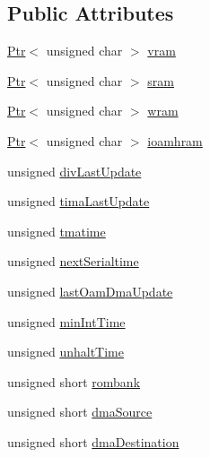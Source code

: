 \subsection*{Public Attributes}
\begin{DoxyCompactItemize}
\item 
\hyperlink{classgambatte_1_1SaveState_1_1Ptr}{Ptr}$<$ unsigned char $>$ \hyperlink{structgambatte_1_1SaveState_1_1Mem_a17be66d9d55708247cb6ea661163d433}{vram}
\item 
\hyperlink{classgambatte_1_1SaveState_1_1Ptr}{Ptr}$<$ unsigned char $>$ \hyperlink{structgambatte_1_1SaveState_1_1Mem_aa0d8ef750665ad81ec84ba8335af5800}{sram}
\item 
\hyperlink{classgambatte_1_1SaveState_1_1Ptr}{Ptr}$<$ unsigned char $>$ \hyperlink{structgambatte_1_1SaveState_1_1Mem_a61d6a15a5e1ac0253bf3a7ad26993619}{wram}
\item 
\hyperlink{classgambatte_1_1SaveState_1_1Ptr}{Ptr}$<$ unsigned char $>$ \hyperlink{structgambatte_1_1SaveState_1_1Mem_a7773fc635ffeec5c35ee65c8f2f55710}{ioamhram}
\item 
unsigned \hyperlink{structgambatte_1_1SaveState_1_1Mem_adfc72668409f448501f371c52c01d060}{div\+Last\+Update}
\item 
unsigned \hyperlink{structgambatte_1_1SaveState_1_1Mem_ac5f805a2892a39121abed21579e6a44a}{tima\+Last\+Update}
\item 
unsigned \hyperlink{structgambatte_1_1SaveState_1_1Mem_a29e42adc04bc7397724ea482ef9f14d1}{tmatime}
\item 
unsigned \hyperlink{structgambatte_1_1SaveState_1_1Mem_a53fc64a87f256305e03d64cbc9381a27}{next\+Serialtime}
\item 
unsigned \hyperlink{structgambatte_1_1SaveState_1_1Mem_a420d6b2a084c5e27c345c9b7a022c229}{last\+Oam\+Dma\+Update}
\item 
unsigned \hyperlink{structgambatte_1_1SaveState_1_1Mem_aaee943320e1021ea6b45a2286076b1fc}{min\+Int\+Time}
\item 
unsigned \hyperlink{structgambatte_1_1SaveState_1_1Mem_accd32508acb68a0119b91f27e17de6be}{unhalt\+Time}
\item 
unsigned short \hyperlink{structgambatte_1_1SaveState_1_1Mem_af1513cc3d50c10b4290221cdbe4be847}{rombank}
\item 
unsigned short \hyperlink{structgambatte_1_1SaveState_1_1Mem_a25213cf5ac03caf9500799a9804b7e77}{dma\+Source}
\item 
unsigned short \hyperlink{structgambatte_1_1SaveState_1_1Mem_ab74c2e63ce1d0eec213133583e7d55f7}{dma\+Destination}

\end{DoxyCompactItemize}
